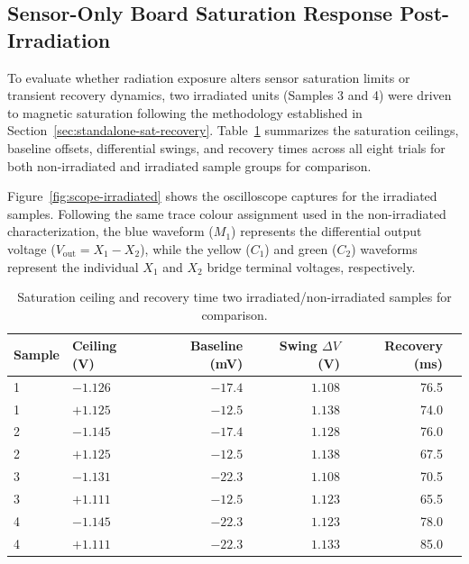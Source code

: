\documentclass[12pt,a4paper]{article}
\begin{document}
\subsection{Sensor-Only Board Saturation Response Post-Irradiation}
\label{sec:rad-sensoronly-response}

To evaluate whether radiation exposure alters sensor saturation limits or transient recovery dynamics, two irradiated units (Samples 3 and 4) were driven to magnetic saturation following the methodology established in Section~\ref{sec:standalone-sat-recovery}. Table~\ref{tab:sat-ceiling-all} summarizes the saturation ceilings, baseline offsets, differential swings, and recovery times across all eight trials for both non-irradiated and irradiated sample groups for comparison.

Figure~\ref{fig:scope-irradiated} shows the oscilloscope captures for the irradiated samples. Following the same trace colour assignment used in the non-irradiated characterization, the blue waveform ($M_1$) represents the differential output voltage ($V_{\text{out}} = X_1 - X_2$), while the yellow ($C_1$) and green ($C_2$) waveforms represent the individual $X_1$ and $X_2$ bridge terminal voltages, respectively.
 


\begin{table}[h]
\centering
\caption{Saturation ceiling and recovery time two irradiated/non-irradiated samples for comparison.}
\label{tab:sat-ceiling-all}
\begin{tabular}{@{}llrrrr@{}}
\toprule
Sample  & Ceiling (V) & Baseline (mV) & Swing $\Delta V$ (V) & Recovery (ms) \\
\midrule
1   & $-1.126$ & $-17.4$ & $1.108$ & 76.5 \\
1   & $+1.125$ & $-12.5$ & $1.138$ & 74.0 \\
2 & $-1.145$ & $-17.4$ & $1.128$ & 76.0 \\
2   & $+1.125$ & $-12.5$ & $1.138$ & 67.5 \\
3       & $-1.131$ & $-22.3$ & $1.108$ & 70.5 \\
3       & $+1.111$ & $-12.5$ & $1.123$ & 65.5 \\
4      & $-1.145$ & $-22.3$ & $1.123$ & 78.0 \\
4       & $+1.111$ & $-22.3$ & $1.133$ & 85.0 \\

\bottomrule
\end{tabular}
\end{table}
\end{document}
